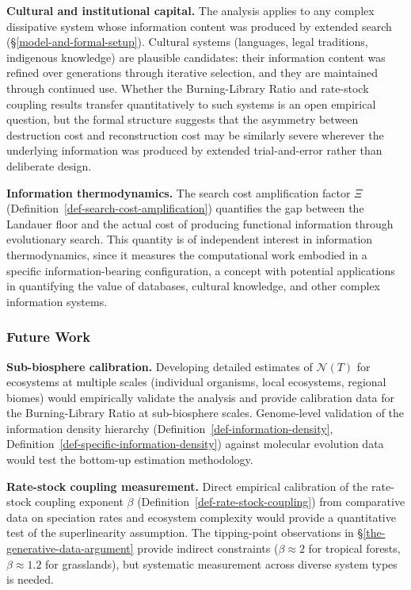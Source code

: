 \documentclass[11pt]{article}
\theoremstyle{plain}
\theoremstyle{definition}
\theoremstyle{remark}
\let\origsubsubsection\subsubsection
\renewcommand{\subsubsection}{\needspace{4\baselineskip}\origsubsubsection}
\begin{document}
\textbf{Cultural and institutional capital.} The analysis applies to any
complex dissipative system whose information content was produced by
extended search (§\ref{model-and-formal-setup}). Cultural systems
(languages, legal traditions, indigenous knowledge) are plausible
candidates: their information content was refined over generations
through iterative selection, and they are maintained through continued
use. Whether the Burning-Library Ratio and rate-stock coupling results
transfer quantitatively to such systems is an open empirical question,
but the formal structure suggests that the asymmetry between destruction
cost and reconstruction cost may be similarly severe wherever the
underlying information was produced by extended trial-and-error rather
than deliberate design.

\textbf{Information thermodynamics.} The search cost amplification
factor \(\Xi\) (Definition~\ref{def-search-cost-amplification})
quantifies the gap between the Landauer floor and the actual cost of
producing functional information through evolutionary search. This
quantity is of independent interest in information thermodynamics, since
it measures the computational work embodied in a specific
information-bearing configuration, a concept with potential applications
in quantifying the value of databases, cultural knowledge, and other
complex information systems.

\subsubsection{Future Work}\label{future-work-2}

\textbf{Sub-biosphere calibration.} Developing detailed estimates of
\(\mathcal{N}(T)\) for ecosystems at multiple scales (individual
organisms, local ecosystems, regional biomes) would empirically validate
the analysis and provide calibration data for the Burning-Library Ratio
at sub-biosphere scales. Genome-level validation of the information
density hierarchy (Definition~\ref{def-information-density},
Definition~\ref{def-specific-information-density}) against molecular
evolution data would test the bottom-up estimation methodology.

\textbf{Rate-stock coupling measurement.} Direct empirical calibration
of the rate-stock coupling exponent \(\beta\)
(Definition~\ref{def-rate-stock-coupling}) from comparative data on
speciation rates and ecosystem complexity would provide a quantitative
test of the superlinearity assumption. The tipping-point observations in
§\ref{the-generative-data-argument} provide indirect constraints
(\(\beta \approx 2\) for tropical forests, \(\beta \approx 1.2\) for
grasslands), but systematic measurement across diverse system types is
needed.
\end{document}
